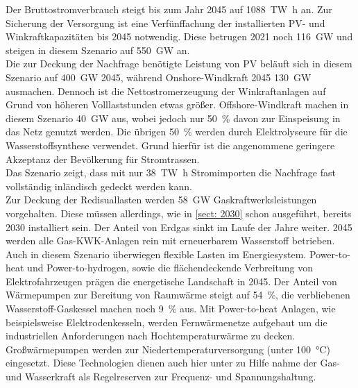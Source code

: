 		Der Bruttostromverbrauch steigt bis zum Jahr 2045 auf \SI{1088}{\tera \watt \hour} an. Zur Sicherung der Versorgung ist eine Verfünffachung der installierten PV- und Winkraftkapazitäten bis 2045 notwendig. Diese betrugen 2021 noch \SI{116}{\giga \watt} und steigen in diesem Szenario auf \SI{550}{\giga \watt} an.\\
		Die zur Deckung der Nachfrage benötigte Leistung von PV beläuft sich in diesem Szenario auf \SI{400}{\giga \watt} 2045, während Onshore-Windkraft 2045 \SI{130}{\giga \watt} ausmachen. Dennoch ist die Nettostromerzeugung der Winkraftanlagen auf Grund von höheren Volllaststunden etwas größer. Offshore-Windkraft machen in diesem Szenario \SI{40}{\giga \watt} aus, wobei jedoch nur \SI{50}{\percent} davon zur Einspeisung in das Netz genutzt werden. Die übrigen \SI{50}{\percent} werden durch Elektrolyseure für die Wasserstoffsynthese verwendet. Grund hierfür ist die angenommene geringere Akzeptanz der Bevölkerung für Stromtrassen.\\
		Das Szenario zeigt, dass mit nur \SI{38}{\tera \watt \hour} Stromimporten die Nachfrage fast vollständig inländisch gedeckt werden kann.\\
		
		Zur Deckung der Redisuallasten werden \SI{58}{\giga \watt} Gaskraftwerksleistungen vorgehalten. Diese müssen allerdings, wie in \ref{sect: 2030} schon ausgeführt, bereits 2030 installiert sein. Der Anteil von Erdgas sinkt im Laufe der Jahre weiter. 2045 werden alle Gas-KWK-Anlagen rein mit erneuerbarem Wasserstoff betrieben.\\
		
		Auch in diesem Szenario überwiegen flexible Lasten im Energiesystem. Power-to-heat und Power-to-hydrogen, sowie die flächendeckende Verbreitung von Elektrofahrzeugen prägen die energetische Landschaft in 2045. Der Anteil von Wärmepumpen zur Bereitung von Raumwärme steigt auf \SI{54}{\percent}, die verbliebenen Wasserstoff-Gaskessel machen noch \SI{9}{\percent} aus. Mit Power-to-heat Anlagen, wie beispielsweise Elektrodenkesseln, werden Fernwärmenetze aufgebaut um die industriellen Anforderungen nach Hochtemperaturwärme zu decken. Großwärmepumpen werden zur Niedertemperaturversorgung (unter \SI{100}{\degreeCelsius}) eingesetzt. Diese Technologien dienen auch hier unter zu Hilfe nahme der Gas- und Wasserkraft als Regelreserven zur Frequenz- und Spannungshaltung.\\
		
